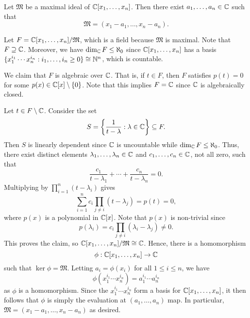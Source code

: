 \begin{thm}[Nullstellensatz]
Let $\mathfrak{M}$ be a maximal ideal of $\mathbb{C}[x_1, \dots, x_n]$. Then there exist 
$a_1, \dots, a_n \in \mathbb{C}$ such that 
\[ \mathfrak M = (x_1-a_1, \dots, x_n-a_n). \]
\end{thm}
\begin{pf}
Let $F = \mathbb{C}[x_1, \dots, x_n]/\mathfrak M$, which is a field because $\mathfrak M$ is maximal. 
Note that $F \supseteq \mathbb{C}$. Moreover, we have $\dim_{\mathbb{C}} F \leq \aleph_0$ since 
$\mathbb{C}[x_1, \dots, x_n]$ has a basis $\{x_1^{i_1} \cdots x_n^{i_n} : i_1, \dots, i_n \geq 0\} 
\cong \mathbb{N}^n$, which is countable. 

We claim that $F$ is algebraic over $\mathbb{C}$. That is, if $t \in F$, then $F$ satisfies $p(t) = 0$ 
for some $p(x) \in \mathbb{C}[x] \setminus \{0\}$. Note that this implies $F = \mathbb{C}$ since $\mathbb{C}$ is 
algebraically closed. 

Let $t \in F \setminus \mathbb{C}$. Consider the set 
\[ S = \left\{ \frac1{t-\lambda} : \lambda \in \mathbb{C}\right\} \subseteq F. \] 
Then $S$ is linearly dependent since $\mathbb{C}$ is uncountable while $\dim_{\mathbb{C}} F \leq \aleph_0$. 
Thus, there exist distinct elements $\lambda_1, \dots, \lambda_n \in \mathbb{C}$ and $c_1, \dots, c_n 
\in \mathbb{C}$, not all zero, such that 
\[ \frac{c_1}{t - \lambda_1} + \cdots + \frac{c_n}{t - \lambda_n} = 0. \]
Multiplying by $\prod_{i=1}^n (t - \lambda_i)$ gives 
\[ \sum_{i=1}^n c_i \prod_{j\neq i} (t - \lambda_j) = p(t) = 0, \]
where $p(x)$ is a polynomial in $\mathbb{C}[x]$. Note that $p(x)$ is non-trivial since 
\[ p(\lambda_i) = c_i \prod_{j\neq i} (\lambda_i - \lambda_j) \neq 0. \]
This proves the claim, so $\mathbb{C}[x_1, \dots, x_n]/\mathfrak M \cong \mathbb{C}$. Hence, there is a homomorphism 
\[ \phi : \mathbb{C}[x_1, \dots, x_n] \to \mathbb{C} \] 
such that $\ker\phi = \mathfrak M$. Letting $a_i = \phi(x_i)$ for all $1 \leq i \leq n$, we have 
\[ \phi(x_1^{i_1} \cdots x_n^{i_n}) = a_1^{i_1} \cdots a_n^{i_n} \]
as $\phi$ is a homomorphism. Since the $x_1^{i_1} \cdots x_n^{i_n}$ form a basis for 
$\mathbb{C}[x_1, \dots, x_n]$, it then follows that $\phi$ is simply the evaluation at 
$(a_1, \dots, a_n)$ map. In particular, $\mathfrak M = (x_1 - a_1, \dots, x_n - a_n)$ as desired.
\end{pf}

